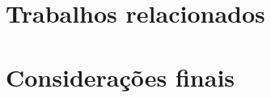 \label{cap-revisao}
\acresetall






\section{Trabalhos relacionados}
\section{Considerações finais}
